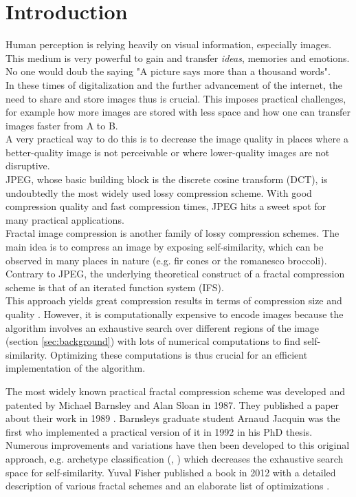 \section{Introduction}\label{sec:intro}
Human perception is relying heavily on visual information, especially images. 
This medium is very powerful to gain and transfer \textit{ideas}, memories and emotions. 
No one would doub the saying  "A picture says more than a thousand words".\\
In these times of digitalization and the further advancement of the internet, the need
to share and store images thus is crucial. This imposes practical challenges, for example
how more images are stored with less space and how one can transfer images faster from A to B.\\
A very practical way to do this is to decrease the image quality in places where a better-quality
image is not perceivable or where lower-quality images are not disruptive. \\
JPEG, whose basic building block is the discrete cosine transform (DCT), is undoubtedly the most widely used lossy compression scheme. 
With good compression quality and fast compression times, JPEG hits a sweet spot for many practical applications.\\
Fractal image compression is another family of lossy compression schemes. The main idea is to compress an image by exposing self-similarity, 
which can be observed in many places in nature (e.g. fir cones or the romanesco broccoli).\\
Contrary to JPEG, the underlying theoretical construct of a fractal compression scheme is that of an iterated function system (IFS).\\
This approach yields great compression results in terms of compression size and quality \cite{fisher2012}. 
However, it is computationally expensive to encode
images because the algorithm involves an exhaustive search over different regions of the image (section \ref{sec:background}) 
with lots of numerical computations to find self-similarity. Optimizing these computations is thus crucial for an efficient implementation of the algorithm.

The most widely known practical fractal compression scheme was developed and patented by Michael Barnsley and Alan Sloan in 1987.
They published a paper about their work in 1989 \cite{barnsley1989fractal}.
Barnsleys graduate student Arnaud Jacquin was the first who implemented a practical version of it in 1992 \cite{jacquin1990fractal} in his PhD thesis.
Numerous improvements and variations have then been developed to this original approach, 
e.g. archetype classification (\cite{jacobs1992image}, \cite{boss1991studies}) which decreases the exhaustive search space for self-similarity. 
Yuval Fisher published a book in 2012 with a detailed description of various fractal schemes and an elaborate list of optimizations \cite{fisher2012}.

